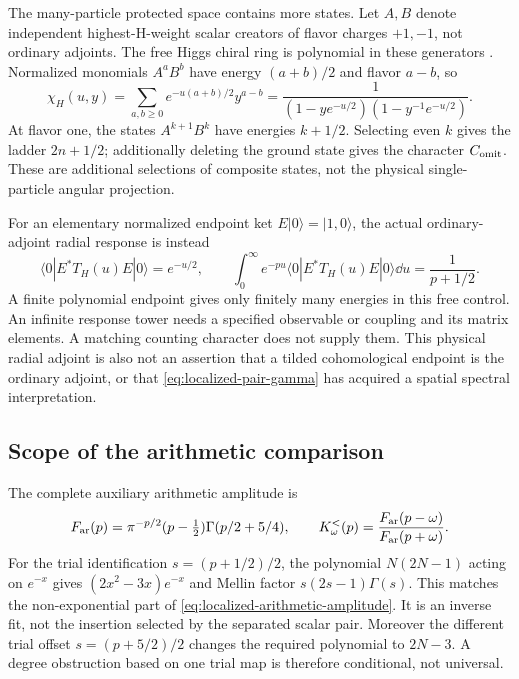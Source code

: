 The many-particle protected space contains more states. Let $A,B$
denote independent highest-H-weight scalar creators of flavor
charges $+1,-1$, not ordinary adjoints. The free Higgs chiral ring
is polynomial in these generators
\cite[Section~4.3.2]{DedushenkoGluing}. Normalized monomials
$A^aB^b$ have energy $(a+b)/2$ and flavor $a-b$, so
\begin{equation}\label{eq:localized-character}
 \chi_H(u,y)
 =\sum_{a,b\geq0}e^{-u(a+b)/2}y^{a-b}
 =\frac1{(1-ye^{-u/2})(1-y^{-1}e^{-u/2})}.
\end{equation}
At flavor one, the states $A^{k+1}B^k$ have energies $k+1/2$.
Selecting even $k$ gives the ladder $2n+1/2$; additionally deleting
the ground state gives the character $C_{\rm omit}$. These are
additional selections of composite states, not the physical
single-particle angular projection.

For an elementary normalized endpoint ket $E|0\rangle=|1,0\rangle$,
the actual ordinary-adjoint radial response is instead
\begin{equation}\label{eq:localized-endpoint-response}
 \langle0|E^*T_H(u)E|0\rangle=e^{-u/2},\qquad
 \int_0^\infty e^{-pu}\langle0|E^*T_H(u)E|0\rangle\dd u
 =\frac1{p+1/2}.
\end{equation}
A finite polynomial endpoint gives only finitely many energies
in this free control. An infinite response tower needs a specified
observable or coupling and its matrix elements. A matching counting
character does not supply them. This physical radial adjoint is
also not an assertion that a tilded cohomological endpoint is the
ordinary adjoint, or that \eqref{eq:localized-pair-gamma} has acquired
a spatial spectral interpretation.

\subsection{Scope of the arithmetic comparison}

The complete auxiliary arithmetic amplitude is
\begin{equation}\label{eq:localized-arithmetic-amplitude}
 F_{\rm ar}(p)=\pi^{-p/2}(p-\tfrac12)\Gamma(p/2+5/4),
 \qquad
 K_\omega^<(p)=\frac{F_{\rm ar}(p-\omega)}{F_{\rm ar}(p+\omega)}.
\end{equation}
For the trial identification $s=(p+1/2)/2$, the polynomial
$N(2N-1)$ acting on $e^{-x}$ gives
$(2x^2-3x)e^{-x}$ and Mellin factor
$s(2s-1)\Gamma(s)$. This matches the non-exponential part of
\eqref{eq:localized-arithmetic-amplitude}. It is an inverse fit,
not the insertion selected by the separated scalar pair.
Moreover the different trial offset $s=(p+5/2)/2$ changes the
required polynomial to $2N-3$. A degree obstruction based on
one trial map is therefore conditional, not universal.

